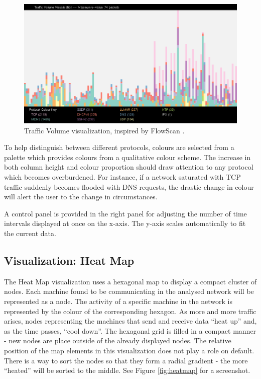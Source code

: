 \begin{figure}[htb]
   \centering
   \includegraphics[width=\linewidth]{materials/traffic-volume.png}
   \caption[Traffic Volume]{\label{fig:traffic-volume}
        Traffic Volume visualization, inspired by FlowScan \cite{plonka2000flowscan}.}
\end{figure}

To help distinguish between different protocols, colours are selected from a palette which provides
colours from a qualitative colour scheme. The increase in both column height and colour proportion
should draw attention to any protocol which becomes overburdened. For instance, if a network
saturated with TCP traffic suddenly becomes flooded with DNS requests, the drastic change in colour
will alert the user to the change in circumstances. 

A control panel is provided in the right panel for adjusting the number of time intervals displayed
at once on the x-axis. The y-axis scales automatically to fit the current data.

\subsection{Visualization: Heat Map}
%
The Heat Map visualization uses a hexagonal map to display a compact cluster of nodes.
Each machine found to be communicating in the analysed network will be represented as a node.
The activity of a specific machine in the network is represented by the colour of the 
corresponding hexagon. As more and more traffic arises, nodes representing the machines that
send and receive data ``heat up'' and, as the time passes, ``cool down''.
The hexagonal grid is filled in a compact manner - new nodes are place outside of 
the already displayed nodes. The relative position of the map elements in this visualization
does not play a role on default. There is a way to sort the nodes so that they form a radial 
gradient - the more ``heated'' will be sorted to the middle. See Figure \ref{fig:heatmap}
for a screenshot.

